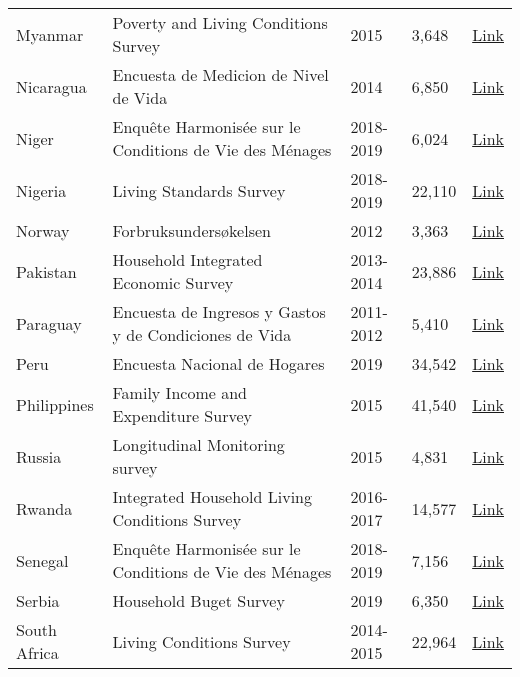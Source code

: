 \begin{ThreePartTable}
\begin{longtable}[t]{l|p{8cm}|l|l|l}
        Myanmar & Poverty and Living Conditions Survey & 2015 &  3,648  & \href{http://hdl.handle.net/10986/29037}{Link} \\ 
        Nicaragua & Encuesta de Medicion de Nivel de Vida & 2014 &  6,850  & \href{https://www.inide.gob.ni/Home/enmv}{Link} \\ 
        Niger & Enquête Harmonisée sur le Conditions de Vie des Ménages & 2018-2019 &  6,024  & \href{https://microdata.worldbank.org/index.php/catalog/4296}{Link} \\ 
        Nigeria & Living Standards Survey & 2018-2019 &  22,110  & \href{https://microdata.worldbank.org/index.php/catalog/5835}{Link} \\ 
        Norway & Forbruksundersøkelsen & 2012 &  3,363  & \href{https://www.ssb.no/inntekt-og-forbruk/artikler-og-publikasjoner/forbruksundersokelsen-2012}{Link} \\ 
        Pakistan & Household Integrated Economic Survey & 2013-2014 &  23,886  & \href{https://www.pbs.gov.pk/publication/household-integrated-economic-survey-hies-2018-19}{Link} \\ 
        Paraguay & Encuesta de Ingresos y Gastos y de Condiciones de Vida & 2011-2012 &  5,410  & \href{https://www.ine.gov.py/microdatos/microdatos.php}{Link} \\ 
        Peru & Encuesta Nacional de Hogares & 2019 &  34,542  & \href{https://www.datosabiertos.gob.pe/dataset/encuesta-nacional-de-hogares-enaho-2019-instituto-nacional-de-estad\%C3\%ADstica-e-inform\%C3\%A1tica-inei}{Link} \\ 
        Philippines & Family Income and Expenditure Survey & 2015 &  41,540  & \href{https://rssoncr.psa.gov.ph/fies}{Link} \\ 
        Russia & Longitudinal Monitoring survey & 2015 &  4,831  & \href{https://www.hse.ru/en/rlms/availability }{Link} \\ 
        Rwanda & Integrated Household Living Conditions Survey & 2016-2017 &  14,577  & \href{https://www.statistics.gov.rw/datasource/integrated-household-living-conditions-survey-eicv}{Link} \\ 
        Senegal & Enquête Harmonisée sur le Conditions de Vie des Ménages & 2018-2019 &  7,156  & \href{https://microdata.worldbank.org/index.php/catalog/4297}{Link} \\ 
        Serbia & Household Buget Survey & 2019 &  6,350  & \href{https://data.stat.gov.rs/?caller=0101\&languageCode=en-US}{Link} \\ 
        South Africa & Living Conditions Survey & 2014-2015 &  22,964  & \href{https://microdata.worldbank.org/index.php/catalog/2882}{Link} \\ 

\end{longtable}
\end{ThreePartTable}

